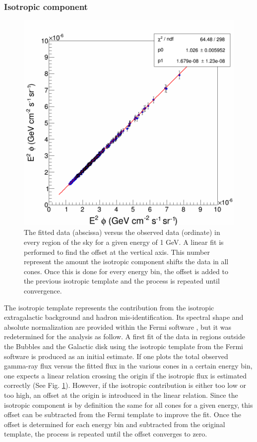 \subsubsection{Isotropic component}

\begin{figure}
 \centering
 \includegraphics[width=.5\linewidth]{pic/method/iso_calibration.png}
 \caption{The fitted data (abscissa) versus the observed data (ordinate) in every region of the sky for a given energy of 1 GeV. A linear fit is performed to find the offset at the vertical axis. This number represent the amount the isotropic component shifts the data in all cones. Once this is done for every energy bin, the offset is added to the previous isotropic template and the process is repeated until convergence.}
 \label{fig:iso_calibration}
\end{figure}


The isotropic template represents the contribution from the isotropic extragalactic background and hadron mis-identification. Its spectral shape and absolute normalization are provided within the Fermi software %
, but it was redetermined for the analysis as follow.
A first fit of the data in regions outside the Bubbles and the Galactic disk using the isotropic template from the Fermi software is produced as an initial estimate. If one plots the total observed gamma-ray flux versus the fitted flux in the various cones in a certain energy bin, one expects a linear relation crossing the origin if the isotropic flux is estimated correctly (See Fig. \ref{fig:iso_calibration}). 
However, if the isotropic contribution is either too low or too high, an offset at the origin is introduced in the linear relation. Since the isotropic component is by definition the same for all cones for a given energy, this offset can be subtracted from the Fermi template to improve the fit.
Once the offset is determined for each energy bin and subtracted from the original template, the process is repeated until the offset converges to zero.

